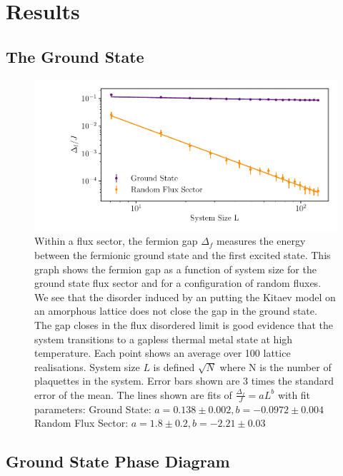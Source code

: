 \hypertarget{results}{%
\section{Results}\label{results}}

\hypertarget{the-ground-state}{%
\subsection{The Ground State}\label{the-ground-state}}

\begin{figure}
\hypertarget{fig:fermion_gap_vs_L}{%
\centering
\includegraphics{figure_code/amk_chapter/results/fermion_gap_vs_L/fermion_gap_vs_L.pdf}
\caption{Within a flux sector, the fermion gap \(\Delta_f\) measures the
energy between the fermionic ground state and the first excited state.
This graph shows the fermion gap as a function of system size for the
ground state flux sector and for a configuration of random fluxes. We
see that the disorder induced by an putting the Kitaev model on an
amorphous lattice does not close the gap in the ground state. The gap
closes in the flux disordered limit is good evidence that the system
transitions to a gapless thermal metal state at high temperature. Each
point shows an average over 100 lattice realisations. System size \(L\)
is defined \(\sqrt{N}\) where N is the number of plaquettes in the
system. Error bars shown are \(3\) times the standard error of the mean.
The lines shown are fits of \(\tfrac{\Delta_f}{J} = aL ^ b\) with fit
parameters: Ground State: \(a = 0.138 \pm 0.002, b = -0.0972 \pm 0.004\)
Random Flux Sector:
\(a = 1.8 \pm 0.2, b = -2.21 \pm 0.03\)}\label{fig:fermion_gap_vs_L}
}
\end{figure}

\hypertarget{ground-state-phase-diagram}{%
\subsection{Ground State Phase
Diagram}\label{ground-state-phase-diagram}}

